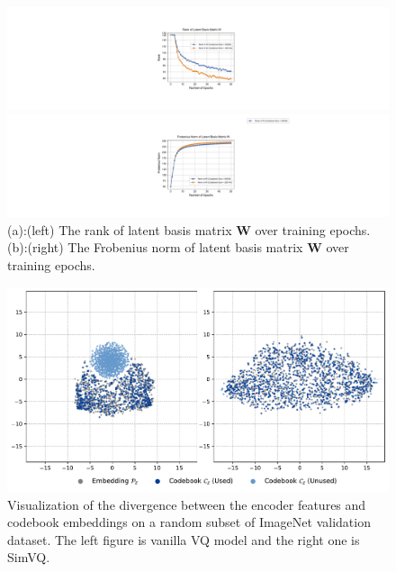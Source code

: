 \begin{figure}[t]
    \centering
    \begin{minipage}[b]{0.49\columnwidth}
        \centering
        \includegraphics[width=\columnwidth]{material/w_rank_65k_262k.pdf}
    \end{minipage}
    \begin{minipage}[b]{0.49\columnwidth}
        \centering
        \includegraphics[width=\columnwidth]{material/w_norm_65k_262k.pdf}
    \end{minipage}
    \caption{(a):(left) The rank of latent basis matrix $\bm{W}$ over training epochs. (b):(right) The Frobenius norm of latent basis matrix $\bm{W}$ over training epochs.}
    \label{fig:rank_norm}
\end{figure}


\begin{figure}[t]
    \centering
    \includegraphics[width=0.8\columnwidth]{material/combined_vq_visualization_part_codebook.pdf}
    \caption{Visualization of the divergence between the encoder features and codebook embeddings on a random subset of ImageNet validation dataset. The left figure is vanilla VQ model and the right one is SimVQ.}
    \label{fig:visualization}
\end{figure}




